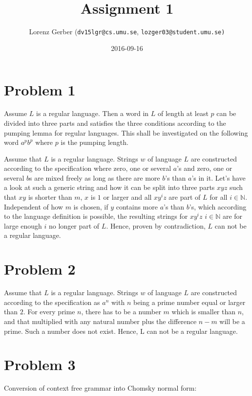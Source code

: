 \documentclass[a4paper,11pt,twoside]{article}
\title{Assignment 1}
\author{Lorenz Gerber ({\tt{dv15lgr@cs.umu.se}}, {\tt{lozger03@student.umu.se})}}
\date{2016-09-16}
\begin{document}
\lstset{language=C}
\maketitle
\thispagestyle{empty}
\newpage

\clearpage
{}

\section*{Problem 1}
Assume $L$ is a regular language. Then a word in $L$ of length at least $p$ can be divided into three parts and satisfies the three conditions according to the pumping lemma for regular languages. This shall be investigated on the following word $a^{p}b^{p}$ where $p$ is the pumping length.




Assume that $L$ is a regular language. Strings $w$ of language $L$ are constructed according to the specification where zero, one or several $a$'s and zero, one or several $b$s are mixed freely as long as there are more $b$'s than $a$'s in it. Let's have a look at such a generic string and how it can be split into three parts $xyz$ such that $xy$ is shorter than $m$, $x$ is $1$ or larger and all $xy^{i}z$ are part of $L$ for all $i \in \mathbb{N}$. Independent of how $m$ is chosen, if $y$ contains more $a$'s than $b$'s, which according to the language definition is possible,  the resulting strings for $xy^{i}z$ $i \in \mathbb{N}$  are for large enough $i$ no longer part of $L$. Hence, proven by contradiction, $L$ can not be a regular language. 

\section*{Problem 2}
Assume that $L$ is a regular language. Strings $w$ of language $L$ are constructed according to the specification as $a^n$ with $n$ being a prime number equal or larger than $2$. For every prime $n$, there has to be a number $m$ which is smaller than $n$, and that multiplied with any natural number plus the difference $n - m$ will be a prime. Such a number does not exist. Hence, L can not be a regular language. 
 

\section*{Problem 3}
Conversion of context free grammar into Chomsky normal form:
\end{document}

